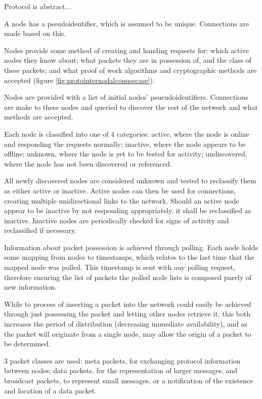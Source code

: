 Protocol is abstract...

A node has a pseudoidentifier, which is assumed to be unique. Connections are made based on this.

Nodes provide some method of creating and handing requests for: which active nodes they know about; what packets they are in possession of, and the class of these packets; and what proof of work algorithms and cryptographic methods are accepted (figure \ref{fig:protointernodalconusecase}).

Nodes are provided with a list of initial nodes' psueudoidentifiers. Connections are make to these nodes and queried to discover the rest of the network and what methods are accepted.

Each node is classified into one of 4 categories: active, where the node is online and responding the requests normally; inactive, where the node appears to be offline; unknown, where the node is yet to be tested for activity; undiscovered, where the node has not been discovered or referenced.

All newly discovered nodes are considered unknown and tested to reclassify them as either active or inactive. Active nodes can then be used for connections, creating multiple unidirectional links to the network. Should an active node appear to be inactive by not responding appropriately, it shall be reclassified as inactive. Inactive nodes are periodically checked for signs of activity and reclassified if necessary. 

Information about packet possession is achieved through polling. Each node holds some mapping from nodes to timestamps, which relates to the last time that the mapped node was polled. This timestamp is sent with any polling request, therefore ensuring the list of packets the polled node lists is composed purely of new information. 

While to process of inserting a packet into the network could easily be achieved through just possessing the packet and letting other nodes retrieve it, this both increases the period of distribution (decreasing immediate availability), and as the packet will originate from a single node, may allow the origin of a packet to be determined. 

3 packet classes are used: meta packets, for exchanging protocol information between nodes; data packets, for the representation of larger messages; and broadcast packets, to represent small messages, or a notification of the existence and location of a data packet.

